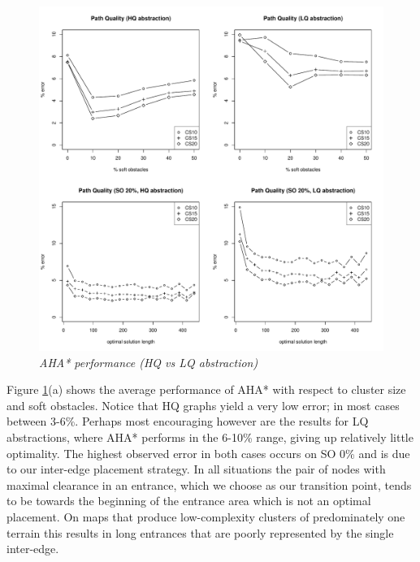 \begin{figure}[htbp]
	\vspace{-12pt}
	\caption{\small{\emph{AHA* performance (HQ vs LQ abstraction)}}}
	\begin{center}
		       \includegraphics[scale=0.25, trim = 20mm 17mm 20mm 5mm]{diagrams/pathquality.pdf}
	\end{center}
	\label{aha-fig:pathquality}
	\vspace{-5pt}
\end{figure}
\par \indent
Figure \ref{aha-fig:pathquality}(a) shows the average performance of AHA* with respect to cluster size and soft obstacles.  
Notice that HQ graphs yield a very low error; in most cases between 3-6\%. 
Perhaps most encouraging however are the results for LQ abstractions, where AHA* performs in the 6-10\% range, giving up relatively little optimality. 
The highest observed error in both cases occurs on SO 0\% and is due to our inter-edge placement strategy.
In all situations the pair of nodes with maximal clearance in an entrance, which we choose as our transition point, tends to be towards the beginning of the entrance area which is not an optimal placement.
On maps that produce low-complexity clusters of predominately one terrain this results in long entrances that are poorly represented by the single inter-edge.
